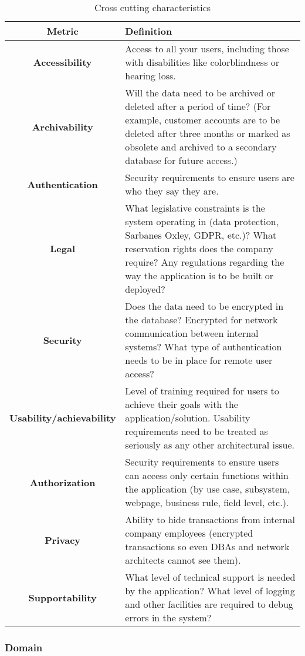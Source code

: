 \documentclass[11pt]{scrartcl} %
\begin{document}
\begin{table}
  \centering
  \begin{tabular}{|c|p{8cm}|}
    \hline
    \textbf{Metric} & \textbf{Definition} \\ \hline
    \textbf{Accessibility} & Access to all your users, including those with disabilities like colorblindness or hearing loss. \\ \hline
    \textbf{Archivability} & Will the data need to be archived or deleted after a period of time? (For example, customer accounts are to be deleted after three months or marked as obsolete and archived to a secondary database for future access.) \\ \hline
    \textbf{Authentication} & Security requirements to ensure users are who they say they are. \\ \hline
    \textbf{Legal} & What legislative constraints is the system operating in (data protection, Sarbanes Oxley, GDPR, etc.)? What reservation rights does the company require? Any regulations regarding the way the application is to be built or deployed? \\ \hline
    \textbf{Security} & Does the data need to be encrypted in the database? Encrypted for network communication between internal systems? What type of authentication needs to be in place for remote user access? \\ \hline
    \textbf{Usability/achievability} & Level of training required for users to achieve their goals with the application/solution. Usability requirements need to be treated as seriously as any other architectural issue. \\ \hline
    \textbf{Authorization} & Security requirements to ensure users can access only certain functions within the application (by use case, subsystem, webpage, business rule, field level, etc.). \\ \hline
    \textbf{Privacy} & Ability to hide transactions from internal company employees (encrypted transactions so even DBAs and network architects cannot see them). \\ \hline
    \textbf{Supportability} & What level of technical support is needed by the application? What level of logging and other facilities are required to debug errors in the system? \\ \hline
    \end{tabular}
    \caption{Cross cutting characteristics}
\end{table}

\subsubsection{Domain}
\end{document}
